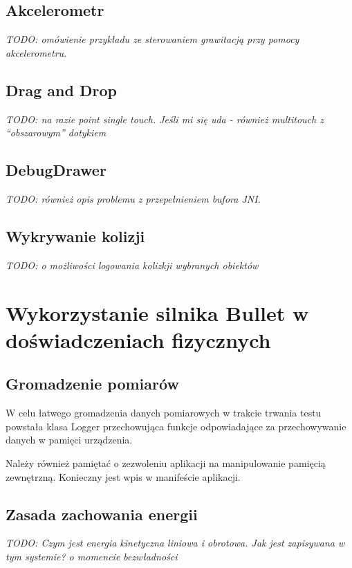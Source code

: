 \subsection{Akcelerometr}
\emph{TODO: omówienie przykładu ze sterowaniem grawitacją przy pomocy
akcelerometru.}

\subsection{Drag and Drop}
\emph{TODO: na razie point single touch. Jeśli mi się uda - również multitouch
z ``obszarowym'' dotykiem}

\subsection{DebugDrawer}
\emph{TODO: również opis problemu z przepełnieniem bufora JNI.}

\subsection{Wykrywanie kolizji}
\emph{TODO: o możliwości logowania kolizkji wybranych obiektów}

\section{Wykorzystanie silnika Bullet w doświadczeniach fizycznych}

\subsection{Gromadzenie pomiarów}

W celu łatwego gromadzenia danych pomiarowych w trakcie trwania testu powstała
klasa Logger przechowująca funkcje odpowiadające za przechowywanie danych w
pamięci urządzenia.
  
Należy również pamiętać o zezwoleniu aplikacji na manipulowanie pamięcią
zewnętrzną. Konieczny jest wpis w manifeście aplikacji.


\subsection{Zasada zachowania energii}
\emph{TODO: Czym jest energia kinetyczna liniowa i obrotowa. Jak jest zapisywana
w tym systemie? o momencie bezwładności}

